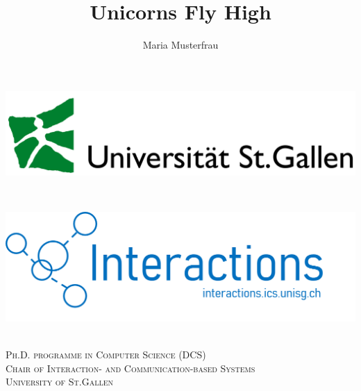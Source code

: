 \documentclass[a4paper,11pt]{article}
\author{Maria Musterfrau}
\title{Unicorns Fly High}
\begin{document}
\begin{titlepage}

\newcommand{\HRule}{\rule{\linewidth}{0.5mm}}
\setlength{\topmargin}{0in}
\center

\begin{minipage}{0.4\textwidth}
\begin{flushleft} \large
\hspace*{-0.5cm}
\includegraphics[scale=0.1]{logos/hsg.png}\\
\end{flushleft}
\end{minipage}
~
\begin{minipage}{0.5\textwidth}
\begin{flushright} \large
\hspace*{2cm}
\includegraphics[scale=0.3]{logos/interactions.png}\\
\end{flushright}
\end{minipage} \\[1cm]

\textsc{\Large Ph.D. programme in Computer Science (DCS)} \\[0.5cm]
\textsc{\Large Chair of Interaction- and Communication-based Systems} \\[0.5cm]
\textsc{\LARGE University of St.Gallen}\\[2.0cm]



\end{titlepage}
\end{document}
